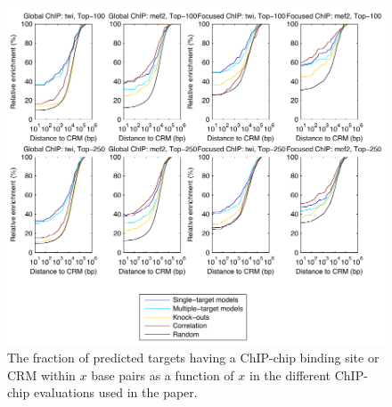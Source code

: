 \documentclass{article}
\begin{document}
\begin{figure}[p]
  \centering
  \includegraphics{Fig_S1}
  \caption{The fraction of predicted targets having a ChIP-chip
    binding site or CRM within $x$ base pairs as a function of $x$
    in the different ChIP-chip evaluations used in the paper.
    \label{fig:dros_binding_site_distances_supplement}}
\end{figure}
\end{document}
